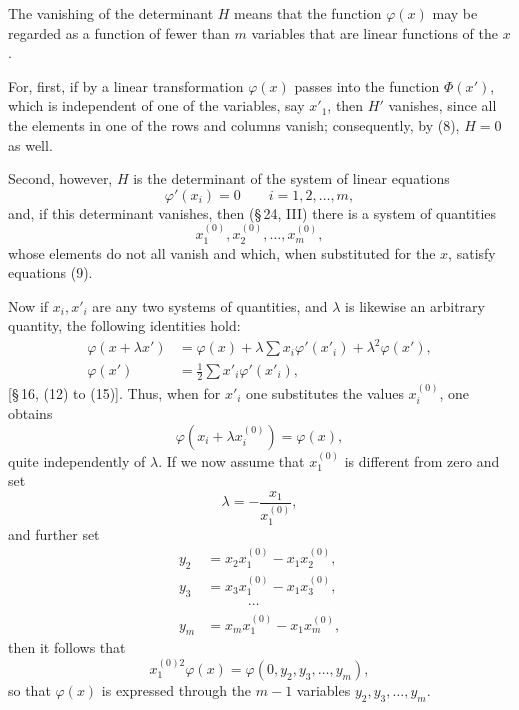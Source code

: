 \documentclass[11pt]{article}
\begin{document}
The vanishing of the determinant $H$ means that the function $\varphi(x)$ may be regarded as a function of fewer than $m$ variables that are linear functions of the $x$.

For, first, if by a linear transformation $\varphi(x)$ passes into the function $\Phi(x')$, which is independent of one of the variables, say $x'_1$, then $H'$ vanishes, since all the elements in one of the rows and columns vanish; consequently, by (8), $H=0$ as well.

Second, however, $H$ is the determinant of the system of linear equations
\begin{equation}
 \varphi'(x_i)=0\qquad i=1,2,\ldots,m,
\tag{9}
\end{equation}
and, if this determinant vanishes, then (\S\,24, III) there is a system of quantities
\begin{equation}
 x_1^{(0)},x_2^{(0)},\ldots,x_m^{(0)},
\tag{10}
\end{equation}
whose elements do not all vanish and which, when substituted for the $x$, satisfy equations (9).

Now if $x_i,x'_i$ are any two systems of quantities, and $\lambda$ is likewise an arbitrary quantity, the following identities hold:
\begin{equation}
\begin{aligned}
 \varphi(x+\lambda x')&=\varphi(x)+\lambda\sum x_i\varphi'(x'_i)+\lambda^2\varphi(x'),\\
 \varphi(x')&=\frac12\sum x'_i\varphi'(x'_i),
\end{aligned}
\tag{11}
\end{equation}
[\S\,16, (12) to (15)]. Thus, when for $x'_i$ one substitutes the values $x_i^{(0)}$, one obtains
\begin{equation}
 \varphi(x_i+\lambda x_i^{(0)})=\varphi(x),
\tag{12}
\end{equation}
quite independently of $\lambda$. If we now assume that $x_1^{(0)}$ is different from zero and set
\[
 \lambda=-\frac{x_1}{x_1^{(0)}},
\]
and further set
\begin{equation}
\begin{aligned}
 y_2&=x_2x_1^{(0)}-x_1x_2^{(0)},\\
 y_3&=x_3x_1^{(0)}-x_1x_3^{(0)},\\
 &\hspace{3em}\cdots\\
 y_m&=x_mx_1^{(0)}-x_1x_m^{(0)},
\end{aligned}
\tag{13}
\end{equation}
then it follows that
\begin{equation}
 x_1^{(0)2}\varphi(x)=\varphi(0,y_2,y_3,\ldots,y_m),
\tag{14}
\end{equation}
so that $\varphi(x)$ is expressed through the $m-1$ variables $y_2,y_3,\ldots,y_m$.
\end{document}
